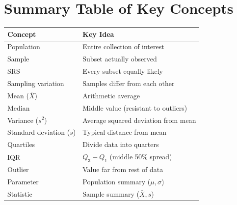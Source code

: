 \documentclass[11pt]{article}
\begin{document}
\section*{Summary Table of Key Concepts}
{\small
\begin{center}
\begin{tabular}{l l}
\toprule
\textbf{Concept} & \textbf{Key Idea} \\
\midrule
Population & Entire collection of interest \\
Sample & Subset actually observed \\
SRS & Every subset equally likely \\
Sampling variation & Samples differ from each other \\
Mean (\(\overline{X}\)) & Arithmetic average \\
Median & Middle value (resistant to outliers) \\
Variance (\(s^2\)) & Average squared deviation from mean \\
Standard deviation (\(s\)) & Typical distance from mean \\
Quartiles & Divide data into quarters \\
IQR & \(Q_3 - Q_1\) (middle 50\% spread) \\
Outlier & Value far from rest of data \\
Parameter & Population summary (\(\mu, \sigma\)) \\
Statistic & Sample summary (\(\overline{X}, s\)) \\
\bottomrule
\end{tabular}
\end{center}
}

\end{document}
